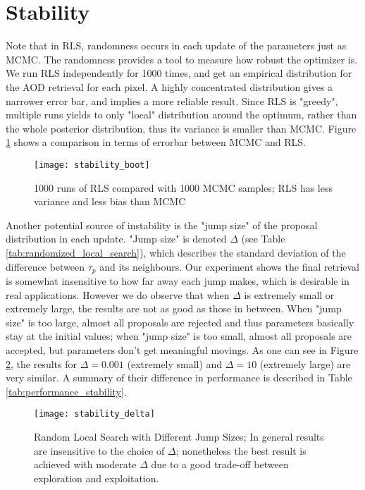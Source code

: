 \section{Stability}
Note that in RLS, randomness occurs in each update of the parameters just as MCMC. The randomness provides a tool to measure how robust the optimizer is. We run RLS independently for 1000 times, and get an empirical distribution for the AOD retrieval for each pixel. A highly concentrated distribution gives a narrower error bar, and implies a more reliable result. Since RLS is "greedy", multiple runs yields to only "local" distribution around the optimum, rather than the whole posterior distribution, thus its variance is smaller than MCMC. Figure \ref{fig:stability_boot} shows a comparison in terms of errorbar between MCMC and RLS.

\begin{figure}[h!]
    \centering
    \texttt{[image: stability\_boot]}
    \caption{1000 runs of RLS compared with 1000 MCMC samples; RLS has less variance and less bias than MCMC}
    \label{fig:stability_boot}
\end{figure}

Another potential source of instability is the "jump size" of the proposal distribution in each update. "Jump size" is denoted $\Delta$ (see Table \ref{tab:randomized_local_search}), which describes the standard deviation of the difference between $\tau_p$ and its neighbours. Our experiment shows the final retrieval is somewhat insensitive to how far away each jump makes, which is desirable in real applications. However we do observe that when $\Delta$ is extremely small or extremely large, the results are not as good as those in between. When "jump size" is too large, almost all proposals are rejected and thus parameters basically stay at the initial values; when "jump size" is too small, almost all proposals are accepted, but parameters don't get meaningful movings. As one can see in Figure \ref{fig:stability_delta}, the results for $\Delta=0.001$ (extremely small) and $\Delta=10$ (extremely large) are very similar. A summary of their difference in performance is described in Table \ref{tab:performance_stability}.


\begin{figure}[h!]
    \centering
    \texttt{[image: stability\_delta]}
    \caption{Random Local Search with Different Jump Sizes; In general results are insensitive to the choice of $\Delta$; nonetheless the best result is achieved with moderate $\Delta$ due to a good trade-off between exploration and exploitation.}
    \label{fig:stability_delta}
\end{figure}

